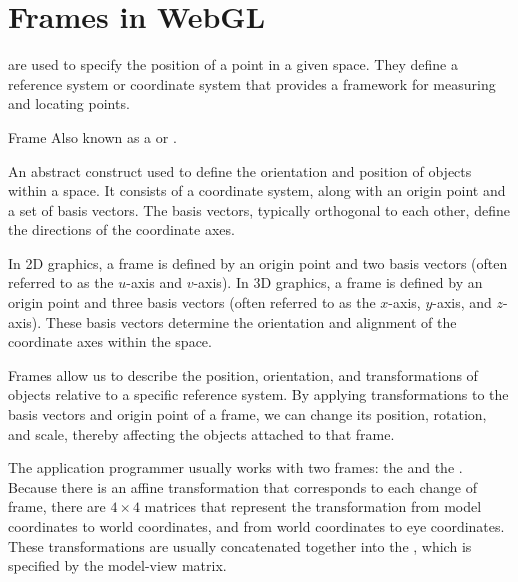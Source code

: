 \documentclass[../COS3712_Notes.tex]{subfiles}
\begin{document}
    \section{Frames in WebGL}
       are used to specify the position of a point in a given space.
      They define a reference system or coordinate system that provides a framework
      for measuring and locating points.

      \begin{definition}{Frame}
        Also known as a  or .

        An abstract construct used to define the orientation and position of objects
        within a space.
        It consists of a coordinate system, along with an origin point and a set of basis vectors.
        The basis vectors, typically orthogonal to each other, define the directions
        of the coordinate axes.
      \end{definition}

      In 2D graphics, a frame is defined by an origin point and two basis vectors
      (often referred to as the $u$-axis and $v$-axis).
      In 3D graphics, a frame is defined by an origin point and three basis vectors
      (often referred to as the $x$-axis, $y$-axis, and $z$-axis).
      These basis vectors determine the orientation and alignment of the coordinate axes
      within the space.

      Frames allow us to describe the position, orientation, and transformations of objects
      relative to a specific reference system.
      By applying transformations to the basis vectors and origin point of a frame,
      we can change its position, rotation, and scale, thereby affecting the objects
      attached to that frame.

      The application programmer usually works with two frames: the 
      and the .
      Because there is an affine transformation that corresponds to each change of frame,
      there are $4 \times 4$ matrices that represent the transformation from model coordinates
      to world coordinates, and from world coordinates to eye coordinates.
      These transformations are usually concatenated together into the
      , which is specified by the model-view matrix.

      \pagebreak
\end{document}
